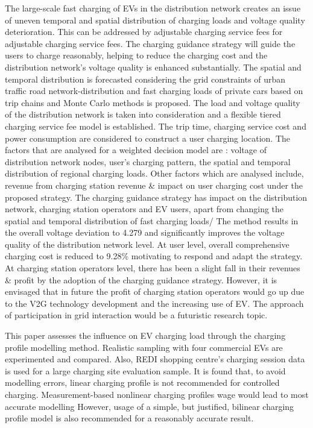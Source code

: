 	\cite{zhang2022fast} The large-scale fast charging of EVs in the distribution network creates an issue of uneven temporal and spatial distribution of charging loads and voltage quality deterioration.  This can be addressed by adjustable charging service fees for adjustable charging service fees. The charging guidance strategy will guide the users to charge reasonably, helping to reduce the charging cost and the distribution network’s voltage quality is enhanced substantially.
	The spatial and temporal distribution is forecasted considering the grid constraints of urban traffic road network-distribution and fast charging loads of private cars based on trip chains and Monte Carlo methods is proposed. The load and voltage quality of the distribution network is taken into consideration and a flexible tiered charging service fee model is established.  The trip time, charging service cost and power consumption are considered to construct a user charging location.  The factors that are analysed for a weighted decision model are : voltage of distribution network nodes, user’s charging pattern,  the spatial and temporal distribution of regional charging loads. Other factors which are analysed include, revenue from charging station revenue \& impact on user charging cost under the proposed strategy. 
	The charging guidance strategy has impact on the distribution network, charging station operators and EV users,  apart from changing the spatial and temporal distribution of fast charging loads/
	The method results in the overall voltage deviation to 4.279 and significantly  improves the  voltage quality of the distribution network level. At user level, overall comprehensive charging cost is reduced to 9.28\% motivating to respond and adapt the strategy. 
	At charging station operators level, there has been a slight fall in their revenues \& profit by the adoption of the charging guidance strategy. However, it is envisaged that in future the profit of charging station operators would go up due to the V2G technology development and the increasing use of EV. 
	The approach of participation in grid interaction would be a futuristic research topic.
	
	
	\cite{simolin2022assessing} This paper assesses the influence on EV charging load through the charging profile modelling method.
	Realistic sampling with four commercial EVs are experimented and compared. Also, REDI shopping centre’s charging session data is used for a large charging site evaluation sample.
	It is found that, to avoid modelling errors, linear charging profile is not recommended for controlled charging.  Measurement-based nonlinear charging profiles wage would lead to most accurate modelling 
	However, usage of a simple, but justified, bilinear charging profile model is also recommended for a reasonably accurate result.
	

